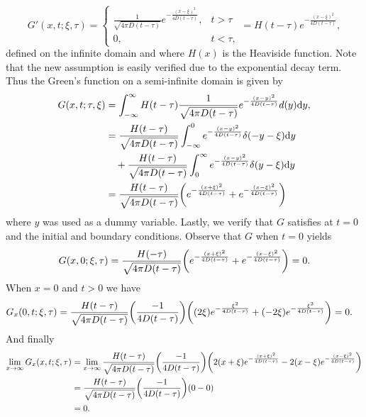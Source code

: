 \documentclass[12pt]{report}
\begin{document}
\begin{solution}
\begin{enumerate}
        \[ 
            G'(x,t;\xi,\tau) = \begin{cases}
                \frac{1}{\sqrt{4\pi D(t - \tau)}}e^{-\frac{(x-\xi)^2}{4D(t-\tau)}}, &t>\tau\\
                0, &t<\tau,
            \end{cases} = H(t - \tau)e^{-\frac{(x-\xi)^2}{4D(t-\tau)}},
        \]
        defined on the infinite domain and where $H(x)$ is the Heaviside function. Note that the new assumption is easily verified due to the exponential decay term. Thus the Green's function on a semi-infinite domain is given by 
        \begin{align*}
            G(x,t;\tau,\xi) &= \int^\infty_{-\infty}H(t - \tau)\frac{1}{\sqrt{4\pi D(t - \tau)}}e^{-\frac{(x-y)^2}{4D(t-\tau)}} d(y) {\mathrm{d}} y,\\
            &= \frac{H(t - \tau)}{\sqrt{4\pi D(t - \tau)}}\int_{-\infty}^0 e^{-\frac{(x-y)^2}{4D(t-\tau)}} \delta(-y-\xi) {\mathrm{d}} y\\
            &\quad + \frac{H(t - \tau)}{\sqrt{4\pi D(t - \tau)}}\int^{\infty}_0 e^{-\frac{(x-y)^2}{4D(t-\tau)}} \delta(y-\xi) {\mathrm{d}} y\\
            &= \frac{H(t - \tau)}{\sqrt{4\pi D(t - \tau)}} {\left(e^{-\frac{(x+\xi)^2}{4D(t-\tau)}} + e^{-\frac{(x-\xi)^2}{4D(t-\tau)}}\right)}
        \end{align*}
        where $y$ was used as a dummy variable. Lastly, we verify that $G$ satisfies  at $t=0$ and the initial and boundary conditions. Observe that $G$ when $t=0$ yields
        \begin{align*}
            G(x,0;\xi,\tau) = \frac{H(- \tau)}{\sqrt{4\pi D(t - \tau)}} {\left(e^{-\frac{(x+\xi)^2}{4D(t-\tau)}} + e^{-\frac{(x-\xi)^2}{4D(t-\tau)}}\right)} = 0.
        \end{align*}  
        When $x=0$ and $t>0$ we have
        \begin{align*}
            G_x(0,t;\xi,\tau) &= \frac{H(t - \tau)}{\sqrt{4\pi D(t - \tau)}} {\left(\frac{-1}{4D(t-\tau)}\right)}{\left((2\xi)e^{-\frac{\xi^2}{4D(t-\tau)}} + (-2\xi) e^{-\frac{\xi^2}{4D(t-\tau)}}\right)}= 0.
        \end{align*}
        And finally
        \begin{align*}
            \lim_{x\to\infty}G_x(x,t;\xi,\tau) &= \lim_{x\to\infty} \frac{H(t - \tau)}{\sqrt{4\pi D(t - \tau)}} {\left(\frac{-1}{4D(t-\tau)}\right)} {\left(2(x + \xi)e^{-\frac{(x+\xi)^2}{4D(t-\tau)}} - 2(x - \xi)e^{-\frac{(x-\xi)^2}{4D(t-\tau)}}\right)}\\
            &= \frac{H(t - \tau)}{\sqrt{4\pi D(t - \tau)}}{\left(\frac{-1}{4D(t-\tau)}\right)} {\left(0 - 0\right)}\\
            &= 0.
        \end{align*}
    
    
    \end{enumerate}
\end{solution}
\end{document}
